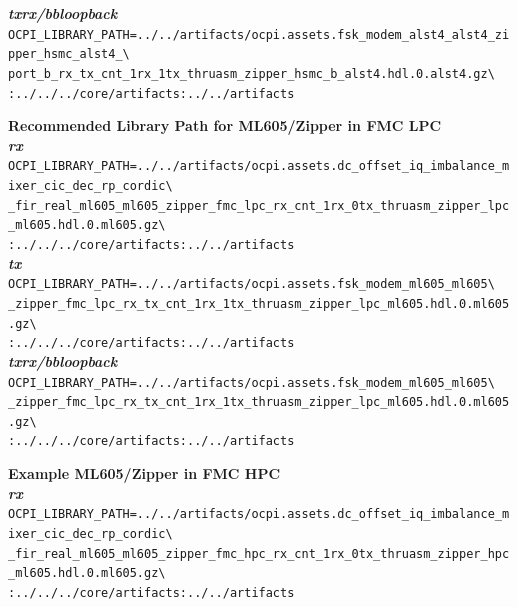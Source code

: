 \noindent\textbf{\textit{txrx/bbloopback}}\\
\verb|OCPI_LIBRARY_PATH=../../artifacts/ocpi.assets.fsk_modem_alst4_alst4_zipper_hsmc_alst4_\| \\
\verb|port_b_rx_tx_cnt_1rx_1tx_thruasm_zipper_hsmc_b_alst4.hdl.0.alst4.gz\| \\
\verb|:../../../core/artifacts:../../artifacts| \\
\par\medskip


\noindent\textbf{Recommended Library Path for ML605/Zipper in FMC LPC}\\

\noindent\textbf{\textit{rx}}\\
\verb|OCPI_LIBRARY_PATH=../../artifacts/ocpi.assets.dc_offset_iq_imbalance_mixer_cic_dec_rp_cordic\| \\
\verb|_fir_real_ml605_ml605_zipper_fmc_lpc_rx_cnt_1rx_0tx_thruasm_zipper_lpc_ml605.hdl.0.ml605.gz\| \\
\verb|:../../../core/artifacts:../../artifacts| \\

\noindent\textbf{\textit{tx}}\\
\verb|OCPI_LIBRARY_PATH=../../artifacts/ocpi.assets.fsk_modem_ml605_ml605\| \\
\verb|_zipper_fmc_lpc_rx_tx_cnt_1rx_1tx_thruasm_zipper_lpc_ml605.hdl.0.ml605.gz\| \\
\verb|:../../../core/artifacts:../../artifacts| \\

\noindent\textbf{\textit{txrx/bbloopback}}\\
\verb|OCPI_LIBRARY_PATH=../../artifacts/ocpi.assets.fsk_modem_ml605_ml605\| \\
\verb|_zipper_fmc_lpc_rx_tx_cnt_1rx_1tx_thruasm_zipper_lpc_ml605.hdl.0.ml605.gz\| \\
\verb|:../../../core/artifacts:../../artifacts| \\
\par\medskip

\noindent\textbf{Example ML605/Zipper in FMC HPC}\\
\noindent\textbf{\textit{rx}}\\
\verb|OCPI_LIBRARY_PATH=../../artifacts/ocpi.assets.dc_offset_iq_imbalance_mixer_cic_dec_rp_cordic\| \\
\verb|_fir_real_ml605_ml605_zipper_fmc_hpc_rx_cnt_1rx_0tx_thruasm_zipper_hpc_ml605.hdl.0.ml605.gz\| \\
\verb|:../../../core/artifacts:../../artifacts| \\

